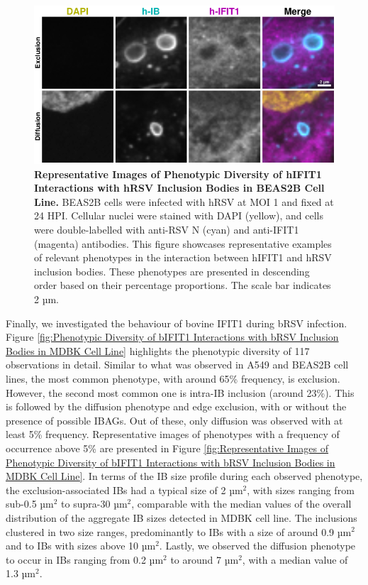 \begin{figure}
    \centering
    \includegraphics[width=1\linewidth]{08. Chapter 3/Figs/02. Infection/01. IFIT1/06. beas2b i1.pdf}
    \caption[Representative Images of Phenotypic Diversity of hIFIT1 Interactions with hRSV Inclusion Bodies in BEAS2B Cell Line.]{\textbf{Representative Images of Phenotypic Diversity of hIFIT1 Interactions with hRSV Inclusion Bodies in BEAS2B Cell Line.} BEAS2B cells were infected with hRSV at MOI 1 and fixed at 24 HPI. Cellular nuclei were stained with DAPI (yellow), and cells were double-labelled with anti-RSV N (cyan) and anti-IFIT1 (magenta) antibodies. This figure showcases representative examples of relevant phenotypes in the interaction between hIFIT1 and hRSV inclusion bodies. These phenotypes are presented in descending order based on their percentage proportions. The scale bar indicates 2 µm.}
    \label{fig:Representative Images of Phenotypic Diversity of hIFIT1 Interactions with hRSV Inclusion Bodies in BEAS2B Cell Line}
\end{figure}

Finally, we investigated the behaviour of bovine IFIT1 during bRSV infection. Figure \ref{fig:Phenotypic Diversity of bIFIT1 Interactions with bRSV Inclusion Bodies in MDBK Cell Line} highlights the phenotypic diversity of 117 observations in detail. Similar to what was observed in A549 and BEAS2B cell lines, the most common phenotype, with around 65\% frequency, is exclusion. However, the second most common one is intra-IB inclusion (around 23\%). This is followed by the diffusion phenotype and edge exclusion, with or without the presence of possible IBAGs. Out of these, only diffusion was observed with at least 5\% frequency. Representative images of phenotypes with a frequency of occurrence above 5\% are presented in Figure \ref{fig:Representative Images of Phenotypic Diversity of bIFIT1 Interactions with bRSV Inclusion Bodies in MDBK Cell Line}. In terms of the IB size profile during each observed phenotype, the exclusion-associated IBs had a typical size of 2 \(\mbox{µm}^2\), with sizes ranging from sub-0.5 \(\mbox{µm}^2\) to supra-30 \(\mbox{µm}^2\), comparable with the median values of the overall distribution of the aggregate IB sizes detected in MDBK cell line. The inclusions clustered in two size ranges, predominantly to IBs with a size of around 0.9 \(\mbox{µm}^2\) and to IBs with sizes above 10 \(\mbox{µm}^2\). Lastly, we observed the diffusion phenotype to occur in IBs ranging from 0.2 \(\mbox{µm}^2\) to around 7 \(\mbox{µm}^2\), with a median value of 1.3 \(\mbox{µm}^2\).

